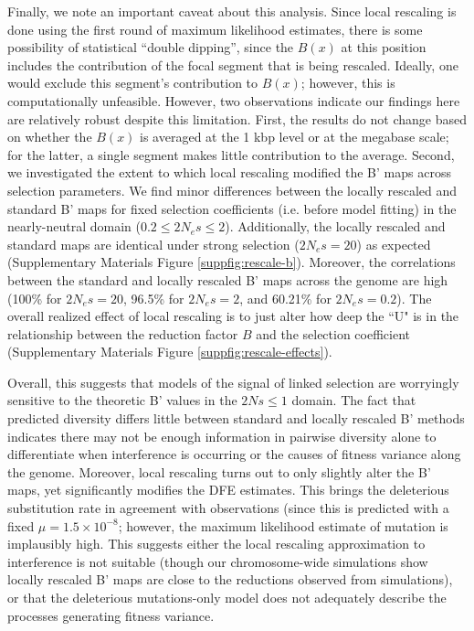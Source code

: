 \documentclass[11pt]{article}
\begin{document}
Finally, we note an important caveat about this analysis. Since local rescaling is done using the first round of maximum likelihood estimates, there is some possibility of statistical ``double dipping'', since the $B(x)$ at this position includes the contribution of the focal segment that is being rescaled. Ideally, one would exclude this segment's contribution to $B(x)$; however, this is computationally unfeasible. However, two observations indicate our findings here are relatively
robust despite this limitation. First, the results do not change based on
whether the $B(x)$ is averaged at the 1 kbp level or at the megabase scale; for the latter, a single segment makes little contribution to the average. Second, we investigated the extent to which local rescaling modified the B' maps across selection parameters. We find minor differences between the locally rescaled and standard B' maps for fixed selection coefficients (i.e. before model fitting) in the nearly-neutral domain ($0.2 \le 2N_e s \le 2$). Additionally, the locally rescaled and standard maps are identical under strong selection ($2N_e s= 20$) as expected (Supplementary Materials Figure \ref{suppfig:rescale-b}). Moreover, the correlations between the standard and locally rescaled B' maps across the genome are high (100\% for $2N_e s = 20$, 96.5\% for $2N_e s = 2$, and 60.21\% for $2N_e s = 0.2$). The overall realized effect of local rescaling is to just alter how deep the ``U" is in the relationship between the reduction factor $B$ and the selection coefficient (Supplementary Materials Figure
\ref{suppfig:rescale-effects}).

Overall, this suggests that models of the signal of linked selection are worryingly sensitive to the theoretic B' values in the $2Ns \le 1$ domain. The fact that predicted diversity differs little between standard and locally rescaled B' methods indicates there may not be enough information in pairwise diversity alone to differentiate when interference is occurring or the causes of fitness variance along the genome. Moreover, local rescaling turns out to only slightly alter the B' maps, yet significantly modifies the DFE estimates. This brings the deleterious substitution rate in agreement with observations (since this is predicted with a fixed $\mu = 1.5 \times 10^{-8}$; however, the maximum likelihood estimate of mutation is implausibly high. This suggests either the local rescaling approximation to interference is not suitable (though our chromosome-wide simulations show locally rescaled B' maps are close to the reductions observed from simulations), or that the deleterious mutations-only model does not adequately describe the processes generating fitness variance.
\end{document}
